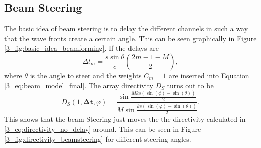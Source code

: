 \subsection{Beam Steering}
The basic idea of beam steering is to delay the different channels in such a way that the wave fronts create a certain angle. This can be seen graphically in Figure \ref{3_fig:basic_idea_beamforming}.
If the delays are
\begin{equation}
    \Delta t_m = \frac{s \sin{\theta}}{c} \left ( \frac{2m - 1 - M}{2}\right ),
\end{equation}
where $\theta$ is the angle to steer and the weights $C_m = 1$ are inserted into Equation \ref{3_eq:beam_model_final}.
The array directivity $D_S$ turns out to be \cite{alma99116706330905515}
\begin{equation}
    D_S(1, \bm{\Delta t} , \varphi) 
    = 
    \frac{\sin{\frac{Mks(\sin{(\phi)} - \sin{(\theta)})}{2}}}{M\sin{\frac{ks(\sin{(\varphi)} - \sin{(\theta)})}{2}}}.
\end{equation}
This shows that the beam Steering just moves the the directivity calculated in \ref{3_eq:directivity_no_delay} around.  
This can be seen in Figure \ref{3_fig:directivity_beamsteering} for different steering angles.  
